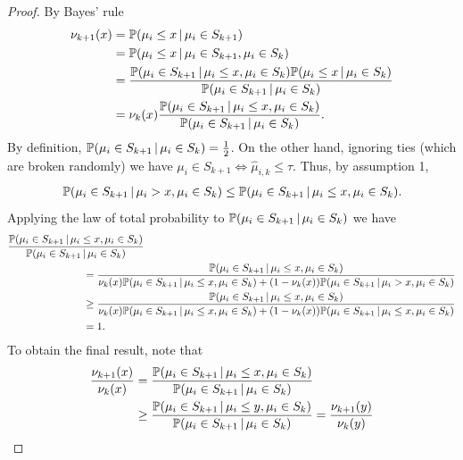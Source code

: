 \begin{proof}
By Bayes' rule
\begin{align*}
\nu_{k+1}(x) &= \P( \mu_i \leq x \, | \, \mu_i \in S_{k+1} )\\
&= \P( \mu_i \leq x \, | \, \mu_i \in S_{k+1}, \mu_i \in S_{k} )\\
&= \frac{ \P( \mu_i \in S_{k+1} \, | \, \mu_i \leq x, \mu_i \in S_{k} ) \P( \mu_i \leq x \, | \, \mu_i \in S_{k}) }{ \P(\mu_i \in S_{k+1} \, | \, \mu_i \in S_{k}) }  \\
&= \nu_k(x) \frac{\P( \mu_i \in S_{k+1} \, | \, \mu_i \leq x, \mu_i \in S_{k} )}{\P(\mu_i \in S_{k+1} \, | \, \mu_i \in S_{k})}.
\end{align*}
By definition, $\P(\mu_i \in S_{k+1} \, | \, \mu_i \in S_{k}) = \frac{1}{2}$. 
On the other hand, ignoring ties (which are broken randomly) we have $\mu_i \in S_{k+1} \iff \widehat{\mu}_{i,k} \leq \tau$.
Thus, by assumption 1,
\begin{align*}
\P( \mu_i \in S_{k+1} \, | \, \mu_i > x, \mu_i \in S_{k} ) \leq \P( \mu_i \in S_{k+1} \, | \, \mu_i \leq x, \mu_i \in S_{k} ).
\end{align*}
Applying the law of total probability to $\P(\mu_i \in S_{k+1} \, | \, \mu_i \in S_{k})$ we have
\begin{align*}
\hspace{1in}&\hspace{-1in}\frac{\P( \mu_i \in S_{k+1} \, | \, \mu_i \leq x, \mu_i \in S_{k} )}{\P(\mu_i \in S_{k+1} \, | \, \mu_i \in S_{k})}\\
&= \frac{\P( \mu_i \in S_{k+1} \, | \, \mu_i \leq x, \mu_i \in S_{k} )}{ \nu_k(x) \P( \mu_i \in S_{k+1} \, | \, \mu_i \leq x, \mu_i \in S_{k} ) + (1-\nu_k(x)) \P( \mu_i \in S_{k+1} \, | \, \mu_i > x, \mu_i \in S_{k} )}\\
&\geq \frac{\P( \mu_i \in S_{k+1} \, | \, \mu_i \leq x, \mu_i \in S_{k} )}{ \nu_k(x) \P( \mu_i \in S_{k+1} \, | \, \mu_i \leq x, \mu_i \in S_{k} ) + (1-\nu_k(x)) \P( \mu_i \in S_{k+1} \, | \, \mu_i \leq x, \mu_i \in S_{k} )} \\
&= 1.
\end{align*}
To obtain the final result, note that
\begin{align*}
\frac{\nu_{k+1}(x)}{\nu_k(x)} &= \frac{\P( \mu_i \in S_{k+1} \, | \, \mu_i \leq x, \mu_i \in S_{k} )}{\P(\mu_i \in S_{k+1} \, | \, \mu_i \in S_{k})} \\
&\geq \frac{\P( \mu_i \in S_{k+1} \, | \, \mu_i \leq y, \mu_i \in S_{k} )}{\P(\mu_i \in S_{k+1} \, | \, \mu_i \in S_{k})} = \frac{\nu_{k+1}(y)}{\nu_k(y)}
\end{align*}
\end{proof}

